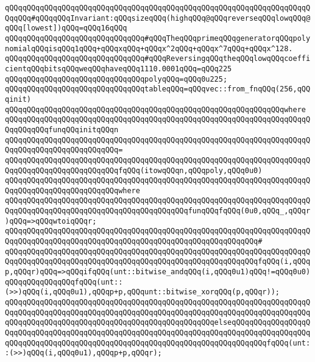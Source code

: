\verb|qQQqqQQqqQQqqQQqqQQqqQQqqQQqqQQqqQQqqQQqqQQqqQQqqQQqqQQqqQQqqQQqqQQqqQQqqQQq#qQQqqQQqInvariant:qQQqsizeqQQq(highqQQq@qQQqreverseqQQqlowqQQq@qQQq[lowest])qQQq=qQQq16qQQq|\newline
\newline
\verb|qQQqqQQqqQQqqQQqqQQqqQQqqQQqqQQq#qQQqTheqQQqprimeqQQqgeneratorqQQqpolynomialqQQqisqQQq1qQQq+qQQqxqQQq+qQQqx^2qQQq+qQQqx^7qQQq+qQQqx^128.|\newline
\verb|qQQqqQQqqQQqqQQqqQQqqQQqqQQqqQQq#qQQqReversingqQQqtheqQQqlowqQQqcoefficientqQQqbitsqQQqweqQQqhaveqQQq1110.0001qQQq=qQQq225|\newline
\newline
\verb|qQQqqQQqqQQqqQQqqQQqqQQqqQQqqQQqpolyqQQq=qQQq0u225;|\newline
\newline
\verb|qQQqqQQqqQQqqQQqqQQqqQQqqQQqqQQqtableqQQq=qQQqvec::from_fnqQQq(256,qQQqinit)|\newline
\verb|qQQqqQQqqQQqqQQqqQQqqQQqqQQqqQQqqQQqqQQqqQQqqQQqqQQqqQQqqQQqqQQqwhere|\newline
\verb|qQQqqQQqqQQqqQQqqQQqqQQqqQQqqQQqqQQqqQQqqQQqqQQqqQQqqQQqqQQqqQQqqQQqqQQqqQQqqQQqfunqQQqinitqQQqn|\newline
\verb|qQQqqQQqqQQqqQQqqQQqqQQqqQQqqQQqqQQqqQQqqQQqqQQqqQQqqQQqqQQqqQQqqQQqqQQqqQQqqQQqqQQqqQQqqQQqqQQq=|\newline
\verb|qQQqqQQqqQQqqQQqqQQqqQQqqQQqqQQqqQQqqQQqqQQqqQQqqQQqqQQqqQQqqQQqqQQqqQQqqQQqqQQqqQQqqQQqqQQqqQQqfqQQq(itowqQQqn,qQQqpoly,qQQq0u0)|\newline
\verb|qQQqqQQqqQQqqQQqqQQqqQQqqQQqqQQqqQQqqQQqqQQqqQQqqQQqqQQqqQQqqQQqqQQqqQQqqQQqqQQqqQQqqQQqqQQqqQQqwhere|\newline
\verb|qQQqqQQqqQQqqQQqqQQqqQQqqQQqqQQqqQQqqQQqqQQqqQQqqQQqqQQqqQQqqQQqqQQqqQQqqQQqqQQqqQQqqQQqqQQqqQQqqQQqqQQqqQQqqQQqfunqQQqfqQQq(0u0,qQQq_,qQQqr)qQQq=>qQQqwtoiqQQqr;|\newline
\verb|qQQqqQQqqQQqqQQqqQQqqQQqqQQqqQQqqQQqqQQqqQQqqQQqqQQqqQQqqQQqqQQqqQQqqQQqqQQqqQQqqQQqqQQqqQQqqQQqqQQqqQQqqQQqqQQqqQQqqQQqqQQqqQQq#|\newline
\verb|qQQqqQQqqQQqqQQqqQQqqQQqqQQqqQQqqQQqqQQqqQQqqQQqqQQqqQQqqQQqqQQqqQQqqQQqqQQqqQQqqQQqqQQqqQQqqQQqqQQqqQQqqQQqqQQqqQQqqQQqqQQqqQQqfqQQq(i,qQQqp,qQQqr)qQQq=>qQQqifqQQq(unt::bitwise_andqQQq(i,qQQq0u1)qQQq!=qQQq0u0)qQQqqQQqqQQqqQQqfqQQq(unt::(>>)qQQq(i,qQQq0u1),qQQqp+p,qQQqunt::bitwise_xorqQQq(p,qQQqr));|\newline
\verb|qQQqqQQqqQQqqQQqqQQqqQQqqQQqqQQqqQQqqQQqqQQqqQQqqQQqqQQqqQQqqQQqqQQqqQQqqQQqqQQqqQQqqQQqqQQqqQQqqQQqqQQqqQQqqQQqqQQqqQQqqQQqqQQqqQQqqQQqqQQqqQQqqQQqqQQqqQQqqQQqqQQqqQQqqQQqqQQqqQQqqQQqqQQqelseqQQqqQQqqQQqqQQqqQQqqQQqqQQqqQQqqQQqqQQqqQQqqQQqqQQqqQQqqQQqqQQqqQQqqQQqqQQqqQQqqQQqqQQqqQQqqQQqqQQqqQQqqQQqqQQqqQQqqQQqqQQqqQQqqQQqqQQqqQQqqQQqqQQqfqQQq(unt::(>>)qQQq(i,qQQq0u1),qQQqp+p,qQQqr);|\newline
